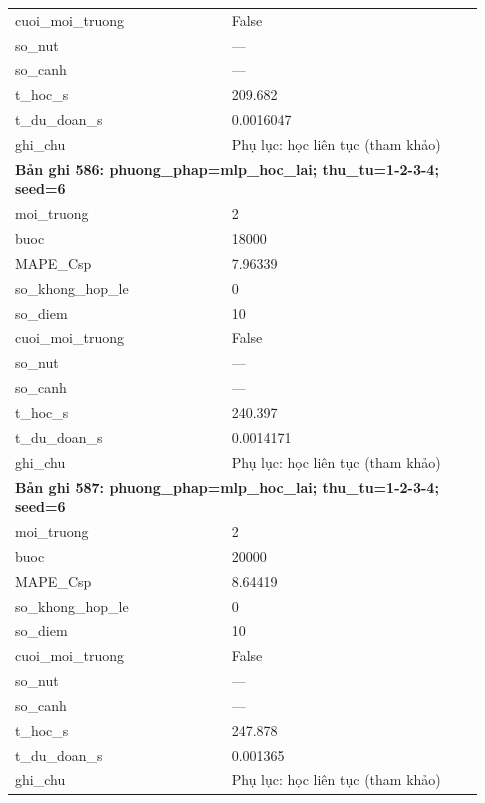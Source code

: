 \begin{longtable}{p{0.43\linewidth}p{0.50\linewidth}}
cuoi\_\allowbreak moi\_\allowbreak truong & False \\
so\_\allowbreak nut & — \\
so\_\allowbreak canh & — \\
t\_\allowbreak hoc\_\allowbreak s & 209.682 \\
t\_\allowbreak du\_\allowbreak doan\_\allowbreak s & 0.0016047 \\
ghi\_\allowbreak chu & Phụ lục: học liên tục (tham khảo) \\
\midrule
\multicolumn{2}{p{0.95\linewidth}}{\textbf{Bản ghi 586: phuong\_phap=mlp\_hoc\_lai; thu\_tu=1-2-3-4; seed=6}} \\
moi\_\allowbreak truong & 2 \\
buoc & 18000 \\
MAPE\_\allowbreak Csp & 7.96339 \\
so\_\allowbreak khong\_\allowbreak hop\_\allowbreak le & 0 \\
so\_\allowbreak diem & 10 \\
cuoi\_\allowbreak moi\_\allowbreak truong & False \\
so\_\allowbreak nut & — \\
so\_\allowbreak canh & — \\
t\_\allowbreak hoc\_\allowbreak s & 240.397 \\
t\_\allowbreak du\_\allowbreak doan\_\allowbreak s & 0.0014171 \\
ghi\_\allowbreak chu & Phụ lục: học liên tục (tham khảo) \\
\midrule
\multicolumn{2}{p{0.95\linewidth}}{\textbf{Bản ghi 587: phuong\_phap=mlp\_hoc\_lai; thu\_tu=1-2-3-4; seed=6}} \\
moi\_\allowbreak truong & 2 \\
buoc & 20000 \\
MAPE\_\allowbreak Csp & 8.64419 \\
so\_\allowbreak khong\_\allowbreak hop\_\allowbreak le & 0 \\
so\_\allowbreak diem & 10 \\
cuoi\_\allowbreak moi\_\allowbreak truong & False \\
so\_\allowbreak nut & — \\
so\_\allowbreak canh & — \\
t\_\allowbreak hoc\_\allowbreak s & 247.878 \\
t\_\allowbreak du\_\allowbreak doan\_\allowbreak s & 0.001365 \\
ghi\_\allowbreak chu & Phụ lục: học liên tục (tham khảo) \\

\end{longtable}
